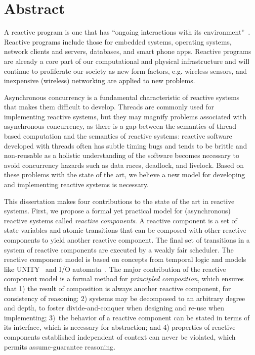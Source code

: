 \chapter*{Abstract}

A reactive program is one that has ``ongoing interactions with its environment''~\cite{manna1992temporal}.
Reactive programs include those for embedded systems, operating systems, network clients and servers, databases, and smart phone apps.
Reactive programs are already a core part of our computational and physical infrastructure and will continue to proliferate our society as new form factors, e.g. wireless sensors, and inexpensive (wireless) networking are applied to new problems.

Asynchronous concurrency is a fundamental characteristic of reactive systems that makes them difficult to develop.
Threads are commonly used for implementing reactive systems, but they may magnify problems associated with asynchronous concurrency, as there is a gap between the semantics of thread-based computation and the semantics of reactive systems:  reactive software developed with threads often has subtle timing bugs and tends to be brittle and non-reusable as a holistic understanding of the software becomes necessary to avoid concurrency hazards such as data races, deadlock, and livelock.
Based on these problems with the state of the art, we believe a new model for developing and implementing reactive systems is necessary.

This dissertation makes four contributions to the state of the art in reactive systems.
First, we propose a formal yet practical model for (asynchronous) reactive systems called \emph{reactive components}.
A reactive component is a set of state variables and atomic transitions that can be composed with other reactive components to yield another reactive component.
The final set of transitions in a system of reactive components are executed by a weakly fair scheduler.
The reactive component model is based on concepts from temporal logic and models like UNITY~\cite{chandy1989parallel} and I/O automata~\cite{nancy1996distributed}.
The major contribution of the reactive component model is a formal method for \emph{principled composition}, which ensures that 1) the result of composition is always another reactive component, for consistency of reasoning; 2) systems may be decomposed to an arbitrary degree and depth, to foster divide-and-conquer when designing and re-use when implementing; 3)~the behavior of a reactive component can be stated in terms of its interface, which is necessary for abstraction; and 4) properties of reactive components established independent of context can never be violated, which permits assume-guarantee reasoning.

